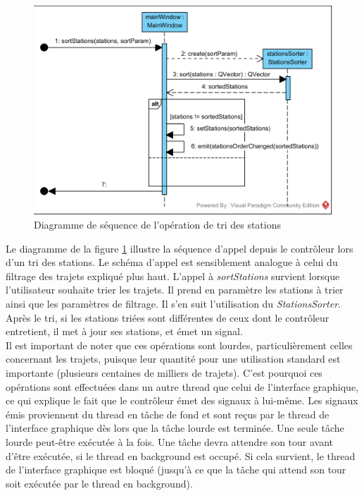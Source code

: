 \documentclass[12pt]{article}
\begin{document}
	\begin{figure}[!h]
	\begin{center}
	\includegraphics[scale=1]{dia_sequence_sortStations.png}
	\caption{Diagramme de séquence de l’opération de tri des stations}
	\label{fig:sortStations}
	\end{center}
	\end{figure}
	
	Le diagramme de la figure \ref{fig:sortStations} illustre la séquence d’appel depuis le contrôleur lors d’un tri des stations. Le schéma d’appel est sensiblement analogue à celui du filtrage des trajets expliqué plus haut. L’appel à \textit{sortStations} survient lorsque l’utilisateur souhaite trier les trajets. Il prend en paramètre les stations à trier ainsi que les paramètres de filtrage. Il s’en suit l’utilisation du \textit{StationsSorter}. Après le tri, si les stations triées sont différentes de ceux dont le contrôleur entretient, il met à jour ses stations, et émet un signal.\\
	
	Il est important de noter que ces opérations sont lourdes, particulièrement celles concernant les trajets, puisque leur quantité pour une utilisation standard est importante (plusieurs centaines de milliers de trajets). C’est pourquoi ces opérations sont effectuées dans un autre thread que celui de l’interface graphique, ce qui explique le fait que le contrôleur émet des signaux à lui-même. Les signaux émis proviennent du thread en tâche de fond et sont reçus par le thread de l’interface graphique dès lors que la tâche lourde est terminée. Une seule tâche lourde peut-être exécutée à la fois. Une tâche devra attendre son tour avant d’être exécutée, si le thread en background est occupé. Si cela survient, le thread de l’interface graphique est bloqué (jusqu’à ce que la tâche qui attend son tour soit exécutée par le thread en background).\\
		
\end{document}
